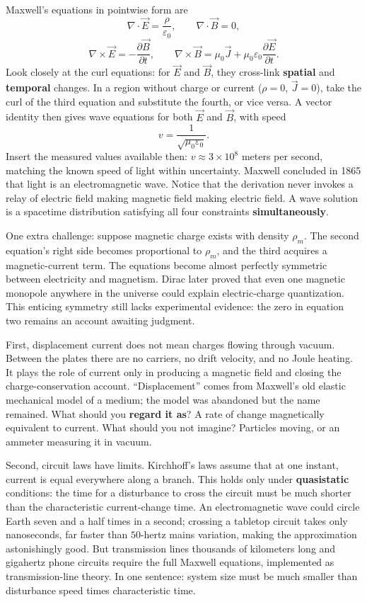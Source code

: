 \begin{challenge}
Maxwell's equations in pointwise form are
\[
\nabla\cdot\vec E=\frac{\rho}{\varepsilon_0},\qquad
\nabla\cdot\vec B=0,
\]
\[
\nabla\times\vec E=-\frac{\partial\vec B}{\partial t},\qquad
\nabla\times\vec B=\mu_0\vec J+\mu_0\varepsilon_0\frac{\partial\vec E}{\partial t}.
\]
Look closely at the curl equations: for \(\vec E\) and \(\vec B\), they cross-link \textbf{spatial} and \textbf{temporal} changes. In a region without charge or current (\(\rho=0\), \(\vec J=0\)), take the curl of the third equation and substitute the fourth, or vice versa. A vector identity then gives wave equations for both \(\vec E\) and \(\vec B\), with speed
\[
v=\frac{1}{\sqrt{\mu_0\varepsilon_0}}.
\]
Insert the measured values available then: \(v\approx3\times10^{8}\) meters per second, matching the known speed of light within uncertainty. Maxwell concluded in 1865 that light is an electromagnetic wave. Notice that the derivation never invokes a relay of electric field making magnetic field making electric field. A wave solution is a spacetime distribution satisfying all four constraints \textbf{simultaneously}.

One extra challenge: suppose magnetic charge exists with density \(\rho_m\). The second equation's right side becomes proportional to \(\rho_m\), and the third acquires a magnetic-current term. The equations become almost perfectly symmetric between electricity and magnetism. Dirac later proved that even one magnetic monopole anywhere in the universe could explain electric-charge quantization. This enticing symmetry still lacks experimental evidence: the zero in equation two remains an account awaiting judgment.
\end{challenge}


First, displacement current does not mean charges flowing through vacuum. Between the plates there are no carriers, no drift velocity, and no Joule heating. It plays the role of current only in producing a magnetic field and closing the charge-conservation account. ``Displacement'' comes from Maxwell's old elastic mechanical model of a medium; the model was abandoned but the name remained. What should you \textbf{regard it as}? A rate of change magnetically equivalent to current. What should you not imagine? Particles moving, or an ammeter measuring it in vacuum.

Second, circuit laws have limits. Kirchhoff's laws assume that at one instant, current is equal everywhere along a branch. This holds only under \textbf{quasistatic} conditions: the time for a disturbance to cross the circuit must be much shorter than the characteristic current-change time. An electromagnetic wave could circle Earth seven and a half times in a second; crossing a tabletop circuit takes only nanoseconds, far faster than \(50\)-hertz mains variation, making the approximation astonishingly good. But transmission lines thousands of kilometers long and gigahertz phone circuits require the full Maxwell equations, implemented as transmission-line theory. In one sentence: system size must be much smaller than disturbance speed times characteristic time.

